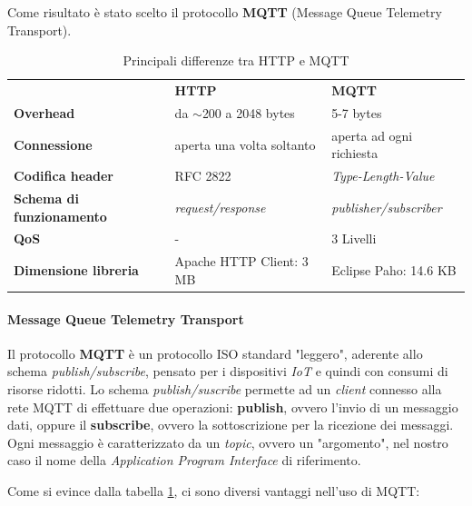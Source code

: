 \documentclass[a4paper,10pt]{memoir}
\begin{document}
Come risultato è stato scelto il protocollo \textbf{MQTT} (Message Queue Telemetry Transport).

\begin{table}[h]
\centering
\caption{Principali differenze tra HTTP e MQTT}
\label{table:mqttdiff}
\begin{tabular}{lll}
                    & \textbf{HTTP} & \textbf{MQTT} \\
\textbf{Overhead} & da $\sim$200 a 2048 bytes & 5-7 bytes \\
\textbf{Connessione} & aperta una volta soltanto & aperta ad ogni richiesta \\
\textbf{Codifica header} & RFC 2822 & \textit{Type-Length-Value} \\
\textbf{Schema di funzionamento} & \textit{request/response} & \textit{publisher/subscriber} \\
\textbf{QoS} & - & 3 Livelli \\
\textbf{Dimensione libreria} & Apache HTTP Client: 3 MB & Eclipse Paho: 14.6 KB \\
\end{tabular}
\end{table}

\paragraph{Message Queue Telemetry Transport} Il protocollo \textbf{MQTT} è un protocollo ISO standard "leggero", aderente allo schema \textit{publish/subscribe}, pensato per i dispositivi \textit{IoT} e quindi con consumi di risorse ridotti. Lo schema \textit{publish/suscribe} permette ad un \textit{client} connesso alla rete MQTT di effettuare due operazioni: \textbf{publish}, ovvero l'invio di un messaggio dati, oppure il \textbf{subscribe}, ovvero la sottoscrizione per la ricezione dei messaggi. Ogni messaggio è caratterizzato da un \textit{topic}, ovvero un "argomento", nel nostro caso il nome della \textit{Application Program Interface} di riferimento.

Come si evince dalla tabella \ref{table:mqttdiff}, ci sono diversi vantaggi nell'uso di MQTT:
\end{document}
